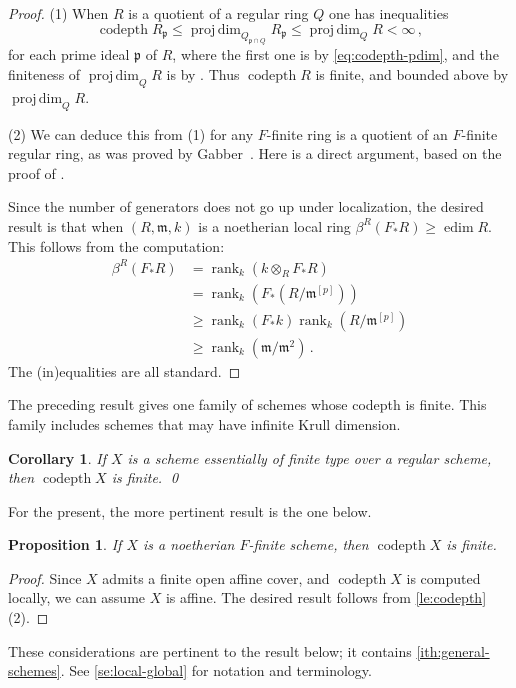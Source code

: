 \documentclass{amsart}
\renewenvironment{align*}{\linenomathNonumbers\oldalignstar}{\oldendalignstar\endlinenomath}
\newcommand{\fm}{\mathfrak{m}}
\newcommand{\fp}{\mathfrak{p}}
\newcommand{\codepth}{\operatorname{codepth}}
\newcommand{\edim}{\operatorname{edim}}
\newcommand{\pdim}{\operatorname{proj\,dim}}
\newcommand{\rank}{\operatorname{rank}}
\newtheorem{proposition}[subsection]{Proposition}
\newtheorem{corollary}[subsection]{Corollary}
\theoremstyle{definition}
\theoremstyle{remark}
\numberwithin{equation}{subsection}
\begin{document}
\begin{proof}
(1) When $R$ is a quotient of a regular ring $Q$ one has inequalities
\[
\codepth R_\fp \le \pdim_{Q_{\fp\cap Q}}R_\fp\le \pdim_Q R<\infty\,,
\]
for each prime ideal $\fp$ of $R$, where the first one is by \eqref{eq:codepth-pdim}, and the finiteness of $\pdim_QR$ is by \cite{Bass/Murthy:1967}. Thus $\codepth R$ is finite, and bounded above by $\pdim_Q R$. 

(2) We can deduce this from (1) for any $F $-finite ring is a quotient of an $F$-finite regular ring, as was proved by Gabber~\cite[Remark 13.6]{Gabber:2004}. Here is a direct argument, based on the proof of \cite[Proposition 1.1]{Kunz:1976}.

Since the number of generators does not go up under localization, the desired result is that when $(R,\fm,k)$ is a noetherian local ring $\beta^R(F _*R)\ge \edim R$. This follows from the computation:
\begin{align*}
\beta^R(F _*R) 
 & = \rank_k (k\otimes_R F _*R) \\
 & = \rank_k (F _*(R/\fm^{[p]}))\\
 &\ge \rank_k(F _*k)\rank_k(R/\fm^{[p]}) \\
 & \ge \rank_k(\fm/\fm^2)\,. 
\end{align*}
The (in)equalities are all standard.
\end{proof}

The preceding result gives one family of schemes whose codepth is finite. This family includes schemes that may have infinite Krull dimension.

\begin{corollary}
\label{co:finite_codpeth}
If $X$ is a scheme essentially of finite type over a regular scheme, then $\codepth X$ is finite. \qed
\end{corollary}

For the present, the more pertinent result is the one below.

\begin{proposition}
\label{pr:codepth-scheme}
If $X$ is a noetherian $F$-finite scheme, then $\codepth X$ is finite. 
\end{proposition}

\begin{proof}
Since $X$ admits a finite open affine cover, and $\codepth X$ is computed locally, we can assume $X$ is affine. The desired result follows from \cref{le:codepth}(2).
\end{proof}
 
These considerations are pertinent to the result below; it contains \cref{ith:general-schemes}. See \cref{se:local-global} for notation and terminology.
\end{document}

